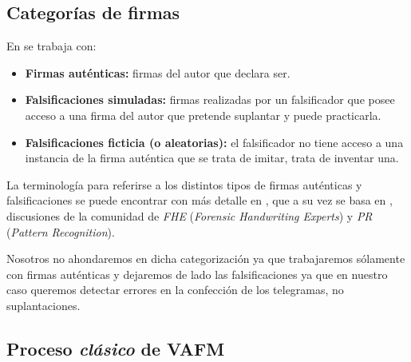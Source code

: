 \subsection{Categorías de firmas}
\label{subsection:categoria-firmas}

En \cite{tesis-parodi} se trabaja con:
\begin{itemize}
    \item \textbf{Firmas auténticas:} firmas del autor que declara ser.
    \item \textbf{Falsificaciones simuladas:} firmas realizadas por un falsificador que posee acceso a una firma del autor que pretende suplantar y puede practicarla.
    \item \textbf{Falsificaciones ficticia (o aleatorias):} el falsificador no tiene acceso a una instancia de la firma auténtica que se trata de imitar, trata de inventar una.
\end{itemize} 

La terminología para referirse a los distintos tipos de firmas auténticas y falsificaciones se puede encontrar con más detalle en \cite{tesis-parodi}, que a su vez se basa en \cite{ml12}, discusiones de la comunidad de \textit{FHE} (\textit{Forensic Handwriting Experts}) y \textit{PR} (\textit{Pattern Recognition}).

Nosotros no ahondaremos en dicha categorización ya que trabajaremos sólamente con firmas auténticas y dejaremos de lado las falsificaciones ya que en nuestro caso queremos detectar errores en la confección de los telegramas, no suplantaciones.

\subsection{Proceso \textit{clásico} de VAFM}

